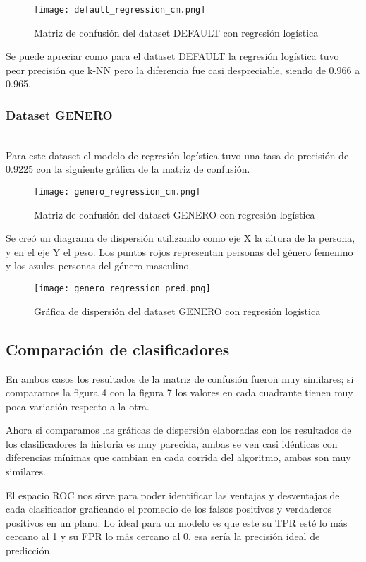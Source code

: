 \documentclass[sigconf,authorversion,nonacm]{acmart}
\begin{document}
\begin{figure}[H]
  \centering
  \texttt{[image: default\_regression\_cm.png]}
  \caption{Matriz de confusión del dataset DEFAULT con regresión logística}
\end{figure}

Se puede apreciar como para el dataset DEFAULT la regresión logística tuvo peor precisión que k-NN pero la diferencia fue casi despreciable, siendo de 0.966 a 0.965.

\subsubsection{Dataset GENERO}\hfill\\
Para este dataset el modelo de regresión logística tuvo una tasa de precisión de 0.9225 con la siguiente gráfica de la matriz de confusión.

\begin{figure}[H]
  \centering
  \texttt{[image: genero\_regression\_cm.png]}
  \caption{Matriz de confusión del dataset GENERO con regresión logística}
\end{figure}

Se creó un diagrama de dispersión utilizando como eje X la altura de la persona, y en el eje Y el peso. Los puntos rojos representan personas del género femenino y los azules personas del género masculino.

\begin{figure}[H]
  \centering
  \texttt{[image: genero\_regression\_pred.png]}
  \caption{Gráfica de dispersión del dataset GENERO con regresión logística}
\end{figure}

\subsection{Comparación de clasificadores}
En ambos casos los resultados de la matriz de confusión fueron muy similares; si comparamos la figura 4 con la figura 7 los valores en cada cuadrante tienen muy poca variación respecto a la otra.

Ahora si comparamos las gráficas de dispersión elaboradas con los resultados de los clasificadores la historia es muy parecida, ambas se ven casi idénticas con diferencias mínimas que cambian en cada corrida del algoritmo, ambas son muy similares. 

El espacio ROC nos sirve para poder identificar las ventajas y desventajas de cada clasificador graficando el promedio de los falsos positivos y verdaderos positivos en un plano. Lo ideal para un modelo es que este su TPR esté lo más cercano al 1 y su FPR lo más cercano al 0, esa sería la precisión ideal de predicción.
\end{document}
